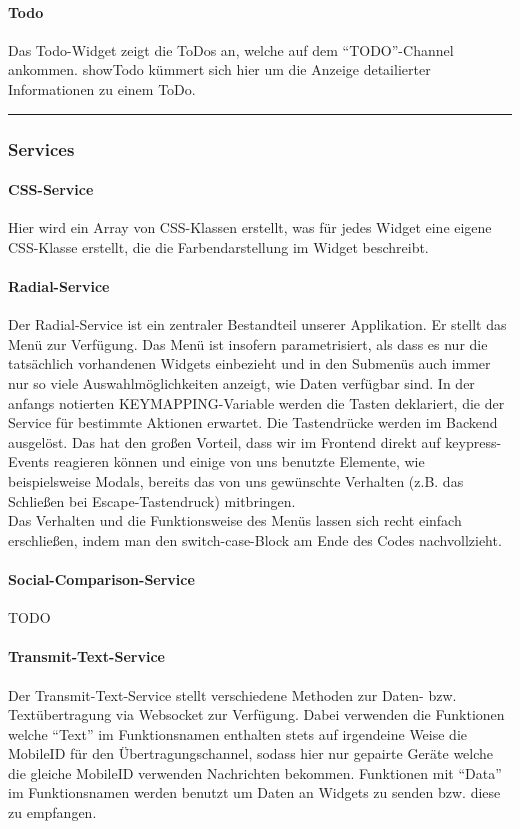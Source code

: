 \documentclass[10pt,a4paper]{report}
\newcommand{\code}[1]{{\fontfamily{cmvtt}\selectfont #1}}
\newcommand{\HRule}{\rule{\linewidth}{0.1pt}} %
\begin{document}
				\paragraph{Todo}
					Das Todo-Widget zeigt die ToDos an, welche auf dem "`TODO"'-Channel ankommen. \code{showTodo} kümmert sich hier um die Anzeige detailierter Informationen zu einem ToDo.\\
				\HRule
			\subsubsection{Services}
				\paragraph{CSS-Service}
					Hier wird ein Array von CSS-Klassen erstellt, was für jedes Widget eine eigene CSS-Klasse erstellt, die die Farbendarstellung im Widget beschreibt.
				\paragraph{Radial-Service}
					Der Radial-Service ist ein zentraler Bestandteil unserer Applikation. Er stellt das Menü zur Verfügung. Das Menü ist insofern parametrisiert, als dass es nur die tatsächlich vorhandenen Widgets einbezieht und in den Submenüs auch immer nur so viele Auswahlmöglichkeiten anzeigt, wie Daten verfügbar sind. In der anfangs notierten \code{KEYMAPPING}-Variable werden die Tasten deklariert, die der Service für bestimmte Aktionen erwartet. Die Tastendrücke werden im Backend ausgelöst. Das hat den großen Vorteil, dass wir im Frontend direkt auf keypress-Events reagieren können und einige von uns benutzte Elemente, wie beispielsweise Modals, bereits das von uns gewünschte Verhalten (z.B. das Schließen bei Escape-Tastendruck) mitbringen.\\
					Das Verhalten und die Funktionsweise des Menüs lassen sich recht einfach erschließen, indem man den switch-case-Block am Ende des Codes nachvollzieht.
				\paragraph{Social-Comparison-Service}
					TODO
				\paragraph{Transmit-Text-Service}
					Der Transmit-Text-Service stellt verschiedene Methoden zur Daten- bzw. Textübertragung via Websocket zur Verfügung. Dabei verwenden die Funktionen welche "`Text"' im Funktionsnamen enthalten stets auf irgendeine Weise die MobileID für den Übertragungschannel, sodass hier nur gepairte Geräte welche die gleiche MobileID verwenden Nachrichten bekommen. Funktionen mit "`Data"' im Funktionsnamen werden benutzt um Daten an Widgets zu senden bzw. diese zu empfangen.
\end{document}
